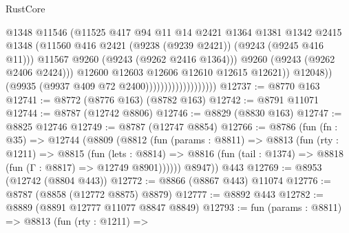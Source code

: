 \begin{lexlean}{RustCore}
\begin{coremodule}
                                                @1348
                                                @11546
                                                (@11525
                                                  @417
                                                  @94
                                                  @11
                                                  @14
                                                  @2421
                                                  @1364
                                                  @1381
                                                  @1342
                                                  @2415
                                                  @1348
                                                  (@11560
                                                    @416
                                                    @2421
                                                    (@9238 (@9239 @2421))
                                                    (@9243 (@9245 @416 @11)))
                                                  @11567
                                                  @9260
                                                  (@9243 (@9262 @2416 @1364)))
                                                @9260
                                                (@9243 (@9262 @2406 @2424)))
                                              @12600
                                              @12603
                                              @12606
                                              @12610
                                              @12615
                                              @12621))
                                          @12048))
                                      (@9935 (@9937 @409 @72 @2400)))))))))))))))))))
@12737 := @8770 @163
@12741 := @8772 (@8776 @163) (@8782 @163)
@12742 := @8791 @11071
@12744 := @8787 (@12742 @8806)
@12746 := @8829 (@8830 @163)
@12747 := @8825 @12746
@12749 := @8787 (@12747 @8854)
@12766 := @8786
    (fun (fn : @35) =>
    @12744
      (@8809
        (@8812
          (fun (params : @8811) =>
          @8813
            (fun (rty : @1211) =>
            @8815
              (fun (lets : @8814) =>
              @8816 (fun (tail : @1374) => @8818 (fun (Γ : @8817) => @12749 @8901))))))
        @8947))
    @443
@12769 := @8953 (@12742 (@8804 @443))
@12772 := @8866 (@8867 @443) @11074
@12776 := @8787 (@8858 (@12772 @8875) @8879)
@12777 := @8892 @443
@12782 := @8889 (@8891 @12777 @11077 @8847 @8849)
@12793 := fun (params : @8811) =>
  @8813
    (fun (rty : @1211) =>

\end{coremodule}
\end{lexlean}

